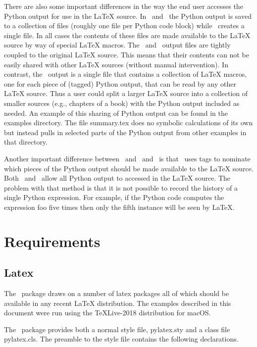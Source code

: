 \documentclass[12pt]{article}
\begin{document}
There are also some important differences in the way the end user accesses the
Python output for use in the LaTeX source. In \PythonTeX\ and \SageTeX\ the Python
output is saved to a collection of files (roughly one file per Python code block)
while \pyLaTeX\ creates a single file. In all cases the contents of these files are
made available to the LaTeX source by way of special LaTeX macros. The \PythonTeX\
and \SageTeX\ output files are tightly coupled to the original LaTeX source. This
means that their contents can not be easily shared with other LaTeX sources
(without manual intervention). In contrast, the \pyLaTeX\ output is a single file
that contains a collection of LaTeX macros, one for each piece of (tagged) Python
output, that can be read by any other LaTeX source. Thus a user could split a
larger LaTeX source into a collection of smaller sources (e.g., chapters of a book)
with the Python output included as needed. An example of this sharing of Python
output can be found in the examples directory. The file {\tts summary.tex} does no
symbolic calculations of its own but instead pulls in selected parts of the Python
output from other examples in that directory.

Another important difference between \pyLaTeX\ and \PythonTeX\ and \SageTeX\ is
that \pyLaTeX\ uses tags to nominate which pieces of the Python output should be
made available to the LaTeX source. Both \PythonTeX\ and \SageTeX\ allow all Python
output to accessed in the LaTeX source. The problem with that method is that it is
not possible to record the history of a single Python expression. For example, if
the Python code computes the expression {\tts foo} five times then only the fifth
instance will be seen by LaTeX.

\section{Requirements}

\subsection{Latex}
The \pyLaTeX\ package draws on a number of latex packages all of which should be
available in any recent LaTeX distribution. The examples described in this document
were run using the {\tts TeXLive-2018} distribution for macOS.

The \pyLaTeX\ package provides both a normal style file, {\tts pylatex.sty} and a
class file {\tts pylatex.cls}. The preamble to the style file contains the
following declarations.
\end{document}
